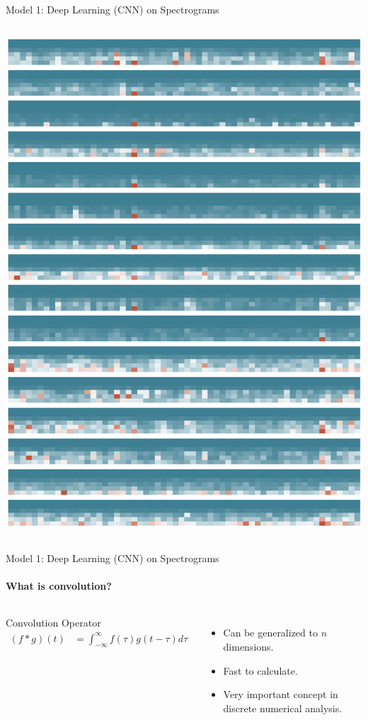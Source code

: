 \documentclass{beamer}
\begin{document}
\begin{frame}{Model 1: Deep Learning (CNN) on Spectrograms}
\begin{columns}
    \includegraphics[scale=0.22]{img/sample_p_spec.eps}
  \end{columns}

\end{frame}


\begin{frame}{Model 1: Deep Learning (CNN) on Spectrograms}
  \framesubtitle{What is convolution?}

  \begin{columns}
    \begin{block}{Convolution Operator}
      \begin{align*}
        (f * g)(t) &= \int_{-\infty}^{\infty}f(\tau) g(t - \tau) d\tau
      \end{align*}
    \end{block}
    \begin{itemize}
    \item Can be generalized to $n$ dimensions.
    \item Fast to calculate.
    \item Very important concept in discrete numerical analysis.
    \end{itemize}
  \end{columns}
\end{frame}
\end{document}

